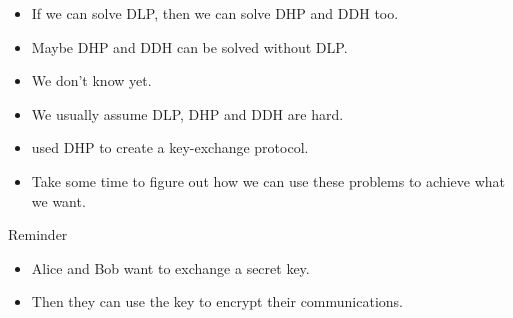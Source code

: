 \begin{frame}
  \begin{itemize}
    \item If we can solve \ac{DLP}, then we can solve \ac{DHP} and \ac{DDH} 
      too.

      \pause{}

    \item Maybe \ac{DHP} and \ac{DDH} can be solved without \ac{DLP}.
    \item We don't know yet.

      \pause{}

    \item We usually assume \ac{DLP}, \ac{DHP} and \ac{DDH} are hard.
  \end{itemize}
\end{frame}

\begin{frame}
  \begin{exercise}
    \begin{itemize}
      \item \citeauthor{DiffieHellman} used 
        \ac{DHP} to create a key-exchange protocol.

        \pause{}

      \item Take some time to figure out how we can use these problems to 
        achieve what we want.
    \end{itemize}
  \end{exercise}

  \begin{block}{Reminder}
    \begin{itemize}
      \item Alice and Bob want to exchange a secret key.
      \item Then they can use the key to encrypt their communications.
    \end{itemize}
  \end{block}
\end{frame}

